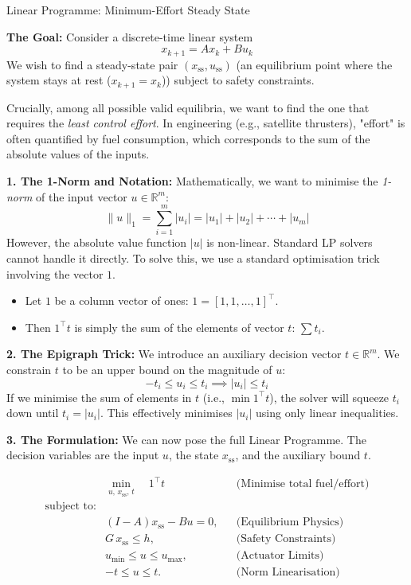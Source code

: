 \begin{examplebox}{Linear Programme: Minimum-Effort Steady State}
	
	\textbf{The Goal:}
	Consider a discrete-time linear system $$x_{k+1} = Ax_k + Bu_k$$ We wish to find a steady-state pair $(x_{\mathrm{ss}}, u_{\mathrm{ss}})$ (an equilibrium point where the system stays at rest ($x_{k+1} = x_k$)) subject to safety constraints.
	
	Crucially, among all possible valid equilibria, we want to find the one that requires the \emph{least control effort}. In engineering (e.g., satellite thrusters), "effort" is often quantified by fuel consumption, which corresponds to the sum of the absolute values of the inputs.
	
	\textbf{1. The 1-Norm and Notation:}
	Mathematically, we want to minimise the \emph{1-norm} of the input vector $u \in \mathbb{R}^m$:
	\begin{equation}
		\|u\|_1 = \sum_{i=1}^{m} |u_i| = |u_1|+|u_2|+\cdots + |u_m|
	\end{equation}
	However, the absolute value function $|u|$ is non-linear. Standard LP solvers cannot handle it directly. To solve this, we use a standard optimisation trick involving the vector $1$.
	\begin{itemize}
		\item Let $1$ be a column vector of ones: $1 = [1, 1, \dots, 1]^\top$.
		\item Then $1^\top t$ is simply the sum of the elements of vector $t$: $\sum t_i$.
	\end{itemize}
	
	\textbf{2. The Epigraph Trick:}
	We introduce an auxiliary decision vector $t \in \mathbb{R}^m$. We constrain $t$ to be an upper bound on the magnitude of $u$:
	\begin{equation}
		-t_i \le u_i \le t_i \implies |u_i| \le t_i
	\end{equation}
	If we minimise the sum of elements in $t$ (i.e., $\min 1^\top t$), the solver will squeeze $t_i$ down until $t_i = |u_i|$. This effectively minimises $|u_i|$ using only linear inequalities.
	
	\textbf{3. The Formulation:}
	We can now pose the full Linear Programme. The decision variables are the input $u$, the state $x_{\mathrm{ss}}$, and the auxiliary bound $t$.
	
	\[
	\begin{aligned}
		&\min_{u,\, x_{\mathrm{ss}},\, t} \quad   1^\top t  && \text{(Minimise total fuel/effort)}\\
		\text{subject to:} &&& \\ 
		& (I-A)x_{\mathrm{ss}} - Bu = 0, && \text{(Equilibrium Physics)}\\
		& G\,x_{\mathrm{ss}} \le h, && \text{(Safety Constraints)}\\
		& u_{\min} \le u \le u_{\max}, && \text{(Actuator Limits)}\\
		& -t \le u \le t. && \text{(Norm Linearisation)}
	\end{aligned}
	\]
	

\end{examplebox}
